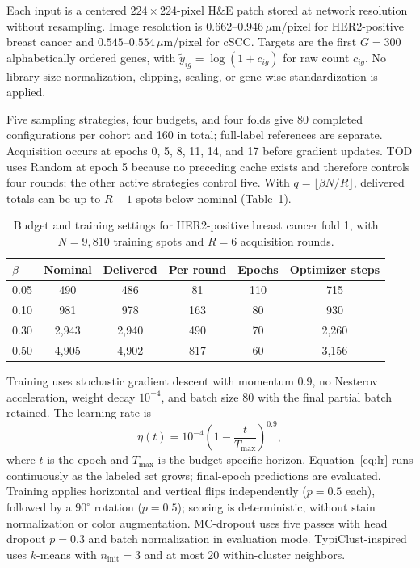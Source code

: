 \documentclass[]{spie}
\begin{document}
Each input is a centered $224\times224$-pixel H\&E patch stored at network resolution without resampling. Image resolution is $0.662$--$0.946\,\mu\mathrm{m}$/pixel for HER2-positive breast cancer and $0.545$--$0.554\,\mu\mathrm{m}$/pixel for cSCC. Targets are the first $G=300$ alphabetically ordered genes, with $\tilde{y}_{ig}=\log(1+c_{ig})$ for raw count $c_{ig}$. No library-size normalization, clipping, scaling, or gene-wise standardization is applied.

Five sampling strategies, four budgets, and four folds give 80 completed configurations per cohort and 160 in total; full-label references are separate. Acquisition occurs at epochs 0, 5, 8, 11, 14, and 17 before gradient updates. TOD uses Random at epoch 5 because no preceding cache exists and therefore controls four rounds; the other active strategies control five. With $q=\lfloor\beta N/R\rfloor$, delivered totals can be up to $R-1$ spots below nominal (Table~\ref{tab:protocol}).

\begin{table}[htbp]
\centering
\caption{Budget and training settings for HER2-positive breast cancer fold 1, with $N=9{,}810$ training spots and $R=6$ acquisition rounds.}
\label{tab:protocol}
\begin{tabular}{lccccc}
\hline
$\beta$ & Nominal & Delivered & Per round & Epochs & Optimizer steps \\
\hline
0.05 & 490 & 486 & 81 & 110 & 715 \\
0.10 & 981 & 978 & 163 & 80 & 930 \\
0.30 & 2,943 & 2,940 & 490 & 70 & 2,260 \\
0.50 & 4,905 & 4,902 & 817 & 60 & 3,156 \\
\hline
\end{tabular}
\end{table}

Training uses stochastic gradient descent with momentum 0.9, no Nesterov acceleration, weight decay $10^{-4}$, and batch size 80 with the final partial batch retained. The learning rate is
\begin{equation}
\eta(t)=10^{-4}\left(1-\frac{t}{T_{\max}}\right)^{0.9},
\label{eq:lr}
\end{equation}
where $t$ is the epoch and $T_{\max}$ is the budget-specific horizon. Equation~\ref{eq:lr} runs continuously as the labeled set grows; final-epoch predictions are evaluated. Training applies horizontal and vertical flips independently ($p=0.5$ each), followed by a $90^{\circ}$ rotation ($p=0.5$); scoring is deterministic, without stain normalization or color augmentation. MC-dropout uses five passes with head dropout $p=0.3$ and batch normalization in evaluation mode. TypiClust-inspired uses $k$-means with $n_{\mathrm{init}}=3$ and at most 20 within-cluster neighbors.
\end{document}
